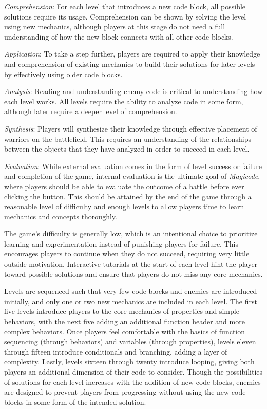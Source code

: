 \documentclass[10pt,twocolumn]{article}
\begin{document}
\textit{Comprehension}: For each level that introduces a new code block, all possible solutions require its usage. Comprehension can be shown by solving the level using new mechanics, although players at this stage do not need a full understanding of how the new block connects with all other code blocks.

\textit{Application}: To take a step further, players are required to apply their knowledge and comprehension of existing mechanics to build their solutions for later levels by effectively using older code blocks.

\textit{Analysis}: Reading and understanding enemy code is critical to understanding how each level works. All levels require the ability to analyze code in some form, although later require a deeper level of comprehension.

\textit{Synthesis}: Players will synthesize their knowledge through effective placement of warriors on the battlefield. This requires an understanding of the relationships between the objects that they have analyzed in order to succeed in each level.

\textit{Evaluation}: While external evaluation comes in the form of level success or failure and completion of the game, internal evaluation is the ultimate goal of \textit{Magicode}, where players should be able to evaluate the outcome of a battle before ever clicking the button. This should be attained by the end of the game through a reasonable level of difficulty and enough levels to allow players time to learn mechanics and concepts thoroughly.

The game’s difficulty is generally low, which is an intentional choice to prioritize learning and experimentation instead of punishing players for failure. This encourages players to continue when they do not succeed, requiring very little outside motivation. Interactive tutorials at the start of each level hint the player toward possible solutions and ensure that players do not miss any core mechanics.

Levels are sequenced such that very few code blocks and enemies are introduced initially, and only one or two new mechanics are included in each level. The first five levels introduce players to the core mechanics of properties and simple behaviors, with the next five adding an additional function header and more complex behaviors. Once players feel comfortable with the basics of function sequencing (through behaviors) and variables (through properties), levels eleven through fifteen introduce conditionals and branching, adding a layer of complexity. Lastly, levels sixteen through twenty introduce looping, giving both players an additional dimension of their code to consider. Though the possibilities of solutions for each level increases with the addition of new code blocks, enemies are designed to prevent players from progressing without using the new code blocks in some form of the intended solution.
\end{document}
